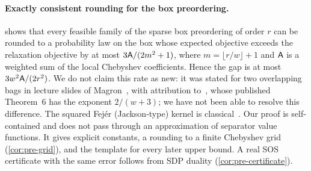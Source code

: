 \paragraph{Exactly consistent rounding for the box preordering.}
 shows that every feasible family of the sparse box
preordering of order $r$ can be rounded to a probability law on the box
whose expected objective exceeds the relaxation objective by at most
$3\mathsf{A}/(2m^2+1)$, where $m=\lfloor r/w\rfloor+1$ and $\mathsf{A}$ is a weighted
sum of the local Chebyshev coefficients. Hence the gap is at most
$3w^2\mathsf{A}/(2r^2)$. We do not claim this rate as new: it was stated for two
overlapping bags in lecture slides of
Magron~\cite{magron2025slides-lorentz,magron2026slides-tenors}, with
attribution to~\cite{korda2025-convergence-rates-sparsity}, whose published
Theorem~6 has the exponent $2/(w+3)$; we have not been able to resolve this
difference. The squared Fejér (Jackson-type) kernel is
classical~\cite{dklerk2017-improved-upper-bounds,laurent2023-effective-schmudgen,korda2025-convergence-rates-sparsity}.
Our proof is self-contained and does not pass through an approximation of
separator value functions. It gives explicit constants, a rounding to a
finite Chebyshev grid (\cref{cor:pre-grid}), and the template for every
later upper bound. A real SOS certificate with the same error follows from
SDP duality (\cref{cor:pre-certificate}).

